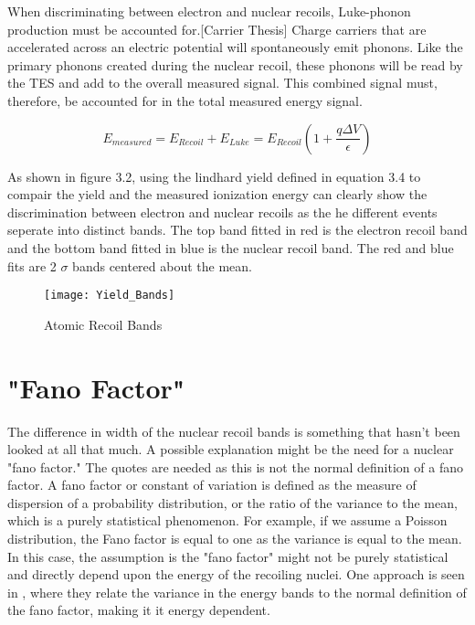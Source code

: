 When discriminating between electron and nuclear recoils, Luke-phonon production must be accounted for.[Carrier Thesis] Charge carriers that are accelerated across an electric potential will spontaneously emit phonons. Like the primary phonons created during the nuclear recoil, these phonons will be read by the TES and add to the overall measured signal. This combined signal must, therefore, be accounted for in the total measured energy signal. 

\begin{equation}
E_{measured} = E_{Recoil} + E_{Luke} = E_{Recoil}(1+\frac{q \Delta V}{\epsilon})
\end{equation}

As shown in figure 3.2, using the lindhard yield defined in equation 3.4 to compair the yield and the measured ionization energy can clearly show the discrimination between electron and nuclear recoils as the he different events seperate into distinct bands. The top band fitted in red is the electron recoil band and the bottom band fitted in blue is the nuclear recoil band. The red and blue fits are 2 $\sigma$ bands centered about the mean. \cite{Note_325} \par



 
\begin{figure}[h]
	\centering
	\texttt{[image: Yield\_Bands]}
	\caption{Atomic Recoil Bands }
\end{figure}

 

\section{"Fano Factor"}
The difference in width of the nuclear recoil bands is something that hasn't been looked at all that much. A possible explanation might be the need for a nuclear "fano factor." The quotes are needed as this is not the normal definition of a fano factor. A fano factor or constant of variation is defined as the measure of dispersion of a probability distribution, or the ratio of the variance to the mean, which is a purely statistical phenomenon. For example, if we assume a Poisson distribution, the Fano factor is equal to one as the variance is equal to the mean. In this case, the assumption is the "fano factor" might not be purely statistical and directly depend upon the energy of the recoiling nuclei. One approach is seen in \cite{Mei}, where they relate the variance in the energy bands to the normal definition of the fano factor, making it it energy dependent. 

